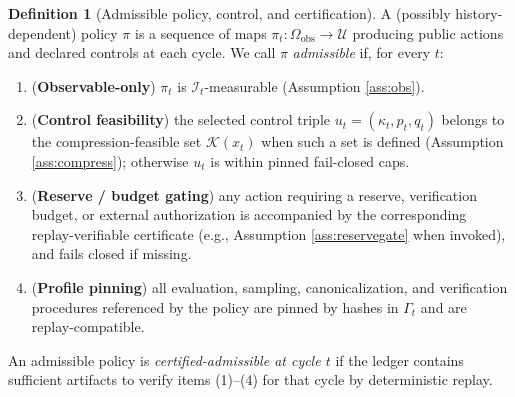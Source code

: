 \documentclass[11pt,a4paper]{article}
\newcommand{\Omegaobs}{\Omega_{\mathrm{obs}}}
\newcommand{\cI}{\mathcal{I}}
\newcommand{\cK}{\mathcal{K}}
\newcommand{\cU}{\mathcal{U}}
\theoremstyle{definition}
\newtheorem{definition}{Definition}
\theoremstyle{remark}
\begin{document}
\begin{definition}[Admissible policy, control, and certification]\label{def:admissible}
A (possibly history-dependent) policy $\pi$ is a sequence of maps $\pi_t:\Omegaobs\to\cU$ producing public actions and declared controls at each cycle.
We call $\pi$ \emph{admissible} if, for every $t$:
\begin{enumerate}
\item (\textbf{Observable-only}) $\pi_t$ is $\cI_t$-measurable (Assumption \ref{ass:obs}).
\item (\textbf{Control feasibility}) the selected control triple $u_t=(\kappa_t,p_t,q_t)$ belongs to the compression-feasible set $\cK(x_t)$ when such a set is defined (Assumption \ref{ass:compress}); otherwise $u_t$ is within pinned fail-closed caps.
\item (\textbf{Reserve / budget gating}) any action requiring a reserve, verification budget, or external authorization is accompanied by the corresponding replay-verifiable certificate (e.g., Assumption \ref{ass:reservegate} when invoked), and fails closed if missing.
\item (\textbf{Profile pinning}) all evaluation, sampling, canonicalization, and verification procedures referenced by the policy are pinned by hashes in $\Gamma_t$ and are replay-compatible.
\end{enumerate}
An admissible policy is \emph{certified-admissible at cycle $t$} if the ledger contains sufficient artifacts to verify items (1)--(4) for that cycle by deterministic replay.
\end{definition}
\end{document}
